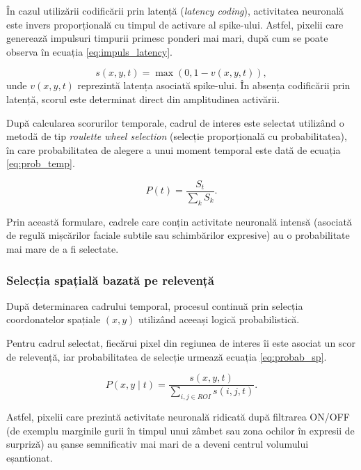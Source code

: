 În cazul utilizării codificării prin latență (\textit{latency coding}), activitatea neuronală este invers proporțională cu timpul de activare al spike-ului. Astfel, pixelii care generează impulsuri timpurii primesc ponderi mai mari, după cum se poate observa în ecuația \eqref{eq:impuls_latency}.

\begin{equation}
	\label{eq:impuls_latency}
	s(x,y,t)=\max(0,1-v(x,y,t)),
\end{equation}
unde $v(x,y,t)$ reprezintă latența asociată spike-ului. În absența codificării prin latență, scorul este determinat direct din amplitudinea activării.

După calcularea scorurilor temporale, cadrul de interes este selectat utilizând o metodă de tip \textit{roulette wheel selection} (selecție proporțională cu probabilitatea), în care probabilitatea de alegere a unui moment temporal este dată de ecuația \eqref{eq:prob_temp}.

\begin{equation}
	\label{eq:prob_temp}
	P(t)=\frac{S_t}{\sum_k S_k}.
\end{equation}

Prin această formulare, cadrele care conțin activitate neuronală intensă (asociată de regulă mișcărilor faciale subtile sau schimbărilor expresive) au o probabilitate mai mare de a fi selectate.

\subsubsection{Selecția spațială bazată pe relevență}

După determinarea cadrului temporal, procesul continuă prin selecția coordonatelor spațiale $(x,y)$ utilizând aceeași logică probabilistică.

Pentru cadrul selectat, fiecărui pixel din regiunea de interes îi este asociat un scor de relevență, iar probabilitatea de selecție urmează ecuația \eqref{eq:probab_sp}.

\begin{equation}
	\label{eq:probab_sp}
	P(x,y \mid t)=
	\frac{s(x,y,t)}
	{\sum_{i,j \in ROI} s(i,j,t)}.
\end{equation}

Astfel, pixelii care prezintă activitate neuronală ridicată după filtrarea ON/OFF (de exemplu marginile gurii în timpul unui zâmbet sau zona ochilor în expresii de surpriză) au șanse semnificativ mai mari de a deveni centrul volumului eșantionat.

